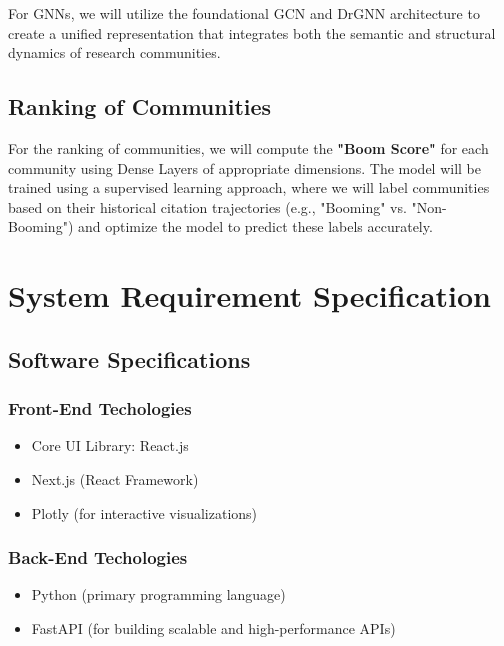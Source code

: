 \documentclass[a4paper,12pt]{article}
\begin{document}
For GNNs, we will utilize the foundational GCN\parencite{kipf_semi-supervised_2016} and DrGNN 
architecture\parencite{zhang_gresnet_2019} to create a unified representation that 
integrates both the semantic and structural dynamics of research communities. 

\subsection{Ranking of Communities}
For the ranking of communities, we will compute the \textbf{"Boom Score"} for each community 
using Dense Layers of appropriate dimensions. The model will be trained using a supervised 
learning approach, where we will label communities based on their historical citation 
trajectories (e.g., "Booming" vs. "Non-Booming") and optimize the model to predict these 
labels accurately.

\newpage

\section{System Requirement Specification}
\subsection{Software Specifications}
\subsubsection{Front-End Techologies}
\begin{itemize}
    \item Core UI Library: React.js
    \vspace{-10pt}
    \item Next.js (React Framework)
    \vspace{-10pt}
    \item Plotly (for interactive visualizations)
\end{itemize}

\subsubsection{Back-End Techologies}
\begin{itemize}
    \item Python (primary programming language)
    \vspace{-10pt}
    \item FastAPI (for building scalable and high-performance APIs)
\end{itemize}
\end{document}
